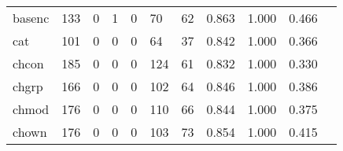\begin{longtable}{lp{1.2cm}p{1.2cm}p{1.2cm}p{1.2cm}p{1.2cm}p{1.2cm}p{1.2cm}p{1.2cm}p{1.2cm}p{1.2cm}}
basenc    &                                   133 &                                                  0 &                                                  1 &                                                  0 &                                                 70 &                                                 62 &                                              0.863 &                                              1.000 &                                              0.466 \\
cat       &                                   101 &                                                  0 &                                                  0 &                                                  0 &                                                 64 &                                                 37 &                                              0.842 &                                              1.000 &                                              0.366 \\
chcon     &                                   185 &                                                  0 &                                                  0 &                                                  0 &                                                124 &                                                 61 &                                              0.832 &                                              1.000 &                                              0.330 \\
chgrp     &                                   166 &                                                  0 &                                                  0 &                                                  0 &                                                102 &                                                 64 &                                              0.846 &                                              1.000 &                                              0.386 \\
chmod     &                                   176 &                                                  0 &                                                  0 &                                                  0 &                                                110 &                                                 66 &                                              0.844 &                                              1.000 &                                              0.375 \\
chown     &                                   176 &                                                  0 &                                                  0 &                                                  0 &                                                103 &                                                 73 &                                              0.854 &                                              1.000 &                                              0.415 \\

\end{longtable}
